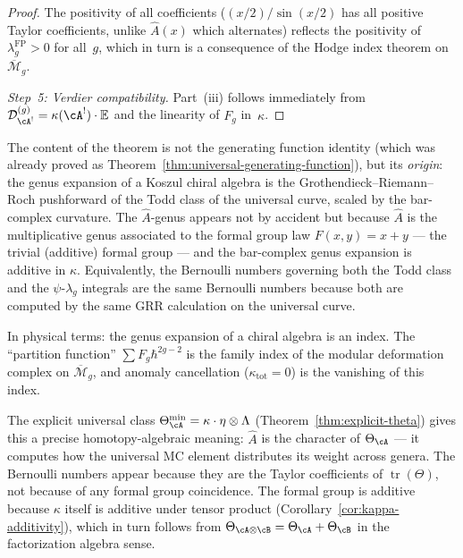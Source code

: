 \begin{proof}
The positivity of all coefficients
($(x/2)/\sin(x/2)$ has all positive Taylor coefficients,
unlike $\hat{A}(x)$ which alternates) reflects the positivity
of $\lambda_g^{\mathrm{FP}} > 0$ for all~$g$, which in turn
is a consequence of the Hodge index theorem on
$\overline{\mathcal{M}}_g$.

\emph{Step~5: Verdier compatibility.}
Part~(iii) follows immediately from
$\mathcal{D}_{\cA^!}^{(g)} = \kappa(\cA^!) \cdot \mathbb{E}$
and the linearity of $F_g$ in~$\kappa$.
\end{proof}

\begin{remark}\label{rem:family-index-punchline}
The content of the theorem is not the generating function identity
(which was already proved as
Theorem~\ref{thm:universal-generating-function}),
but its \emph{origin}: the genus expansion of a Koszul chiral
algebra is the Grothendieck--Riemann--Roch pushforward of the
Todd class of the universal curve, scaled by the bar-complex
curvature.  The $\hat{A}$-genus appears not by accident but because
$\hat{A}$ is the multiplicative genus associated to the formal
group law $F(x,y) = x + y$ --- the trivial (additive) formal
group --- and the bar-complex genus expansion is additive in
$\kappa$.  Equivalently, the Bernoulli numbers governing both the
Todd class and the $\psi$-$\lambda_g$ integrals are the same
Bernoulli numbers because both are computed by the same GRR
calculation on the universal curve.

In physical terms: the genus expansion of a chiral algebra is
an index.  The ``partition function'' $\sum F_g \hbar^{2g-2}$
is the family index of the modular deformation complex on
$\overline{\mathcal{M}}_g$, and anomaly cancellation
($\kappa_{\mathrm{tot}} = 0$) is the vanishing of this index.

The explicit universal class
$\Theta_{\cA}^{\min} = \kappa \cdot \eta \otimes \Lambda$
(Theorem~\ref{thm:explicit-theta}) gives this a precise
homotopy-algebraic meaning: $\hat{A}$ is the character of
$\Theta_{\cA}$ --- it computes how the universal MC element
distributes its weight across genera.  The Bernoulli numbers
appear because they are the Taylor coefficients of
$\operatorname{tr}(\Theta)$, not because of any formal group
coincidence.  The formal group is additive because $\kappa$
itself is additive under tensor product
(Corollary~\ref{cor:kappa-additivity}), which in turn follows
from $\Theta_{\cA \otimes \cB} = \Theta_{\cA} + \Theta_{\cB}$
in the factorization algebra sense.
\end{remark}

